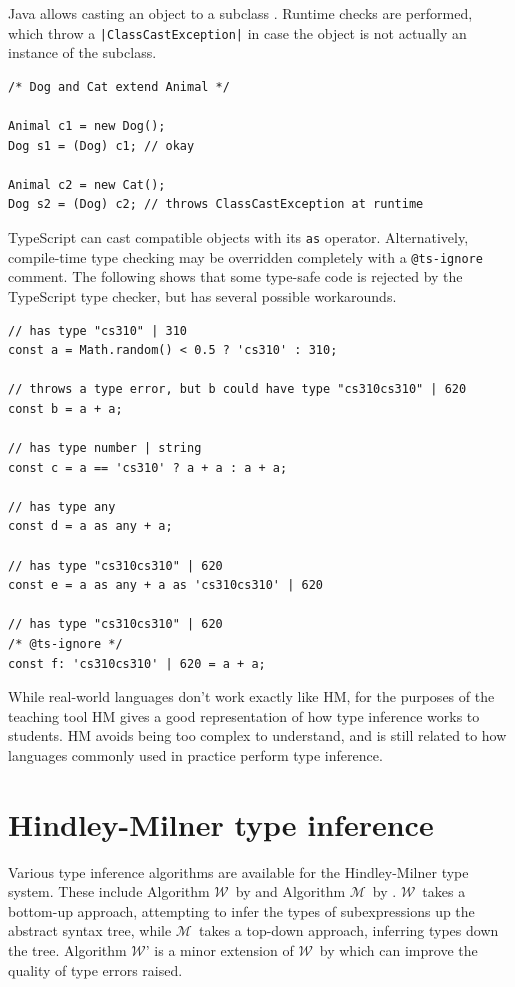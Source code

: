 \documentclass[a4paper,fleqn,oneside,12pt]{report}
\newcommand{\W}{$\mathcal{W}$}
\newcommand{\M}{$\mathcal{M}$}
\begin{document}
Java allows casting an object to a subclass \citep{ref25}. Runtime checks are performed, which throw a \texttt{|ClassCastException|} in case the object is not actually an instance of the subclass.

\begin{verbatim}
/* Dog and Cat extend Animal */

Animal c1 = new Dog();
Dog s1 = (Dog) c1; // okay

Animal c2 = new Cat();
Dog s2 = (Dog) c2; // throws ClassCastException at runtime
\end{verbatim}

TypeScript can cast compatible objects with its \texttt{as} operator. Alternatively, compile-time type checking may be overridden completely with a \texttt{@ts-ignore} comment. The following shows that some type-safe code is rejected by the TypeScript type checker, but has several possible workarounds.

\begin{verbatim}
// has type "cs310" | 310
const a = Math.random() < 0.5 ? 'cs310' : 310;

// throws a type error, but b could have type "cs310cs310" | 620
const b = a + a;

// has type number | string
const c = a == 'cs310' ? a + a : a + a;

// has type any
const d = a as any + a;

// has type "cs310cs310" | 620
const e = a as any + a as 'cs310cs310' | 620

// has type "cs310cs310" | 620
/* @ts-ignore */
const f: 'cs310cs310' | 620 = a + a;
\end{verbatim}

While real-world languages don't work exactly like HM, for the purposes of the teaching tool HM gives a good representation of how type inference works to students. HM avoids being too complex to understand, and is still related to how languages commonly used in practice perform type inference.

\section{Hindley-Milner type inference}\label{id:h.admfqf7bhkct}

Various type inference algorithms are available for the Hindley-Milner type system. These include Algorithm \W\ by \cite{ref13} and Algorithm \M\ by \cite{ref27}. \W\ takes a bottom-up approach, attempting to infer the types of subexpressions up the abstract syntax tree, while \M\ takes a top-down approach, inferring types down the tree. Algorithm \W' is a minor extension of \W\ by \cite{ref28} which can improve the quality of type errors raised.
\end{document}
